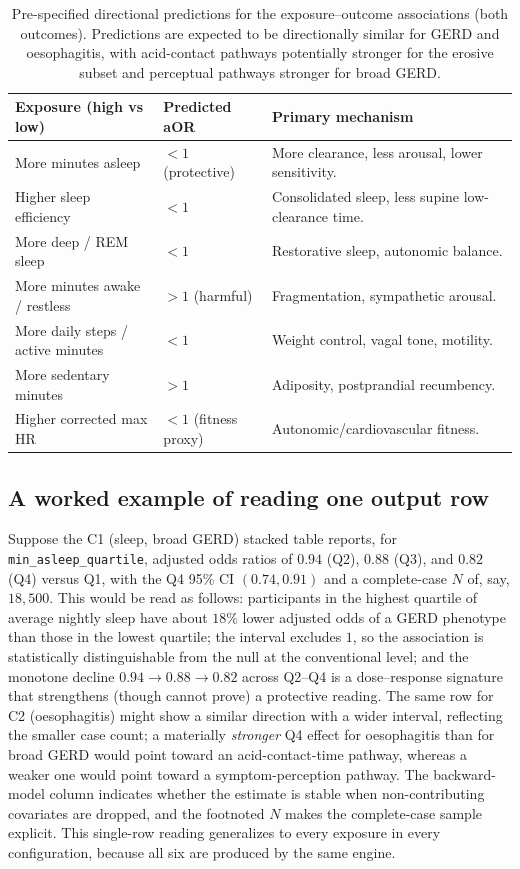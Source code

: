 \documentclass[11pt]{article}
\newcommand{\code}[1]{\texttt{\small #1}}
\begin{document}
\begin{table}[h]
\centering
\footnotesize
\begin{tabular}{@{}p{4.6cm}p{2.6cm}p{5.6cm}@{}}
\toprule
\textbf{Exposure (high vs low)} & \textbf{Predicted aOR} & \textbf{Primary mechanism} \\
\midrule
More minutes asleep & $<1$ (protective) & More clearance, less arousal, lower sensitivity. \\
Higher sleep efficiency & $<1$ & Consolidated sleep, less supine low-clearance time. \\
More deep / REM sleep & $<1$ & Restorative sleep, autonomic balance. \\
More minutes awake / restless & $>1$ (harmful) & Fragmentation, sympathetic arousal. \\
More daily steps / active minutes & $<1$ & Weight control, vagal tone, motility. \\
More sedentary minutes & $>1$ & Adiposity, postprandial recumbency. \\
Higher corrected max HR & $<1$ (fitness proxy) & Autonomic/cardiovascular fitness. \\
\bottomrule
\end{tabular}
\caption{Pre-specified directional predictions for the exposure--outcome associations (both outcomes).
Predictions are expected to be directionally similar for GERD and oesophagitis, with acid-contact
pathways potentially stronger for the erosive subset and perceptual pathways stronger for broad GERD.}
\end{table}

\subsection{A worked example of reading one output row}
Suppose the C1 (sleep, broad GERD) stacked table reports, for \code{min_asleep_quartile}, adjusted odds
ratios of $0.94$ (Q2), $0.88$ (Q3), and $0.82$ (Q4) versus Q1, with the Q4 95\% CI $(0.74, 0.91)$ and a
complete-case $N$ of, say, $18{,}500$. This would be read as follows: participants in the highest
quartile of average nightly sleep have about $18\%$ lower adjusted odds of a GERD phenotype than those in
the lowest quartile; the interval excludes $1$, so the association is statistically distinguishable from
the null at the conventional level; and the monotone decline $0.94 \rightarrow 0.88 \rightarrow 0.82$
across Q2--Q4 is a dose--response signature that strengthens (though cannot prove) a protective reading.
The same row for C2 (oesophagitis) might show a similar direction with a wider interval, reflecting the
smaller case count; a materially \emph{stronger} Q4 effect for oesophagitis than for broad GERD would
point toward an acid-contact-time pathway, whereas a weaker one would point toward a
symptom-perception pathway. The backward-model column indicates whether the estimate is stable when
non-contributing covariates are dropped, and the footnoted $N$ makes the complete-case sample explicit.
This single-row reading generalizes to every exposure in every configuration, because all six are
produced by the same engine.
\end{document}
